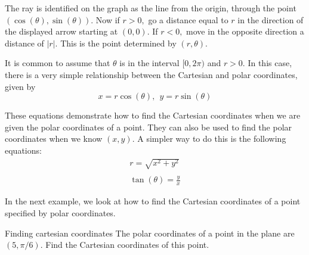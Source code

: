 The ray is identified on the graph as the line from the origin, through the point $(\cos(\theta),\sin(\theta))$. Now if $r>0,$ go a distance
equal to $r$ in the direction of the displayed arrow starting at $(0,0)$. If 
$r<0,$ move in the opposite direction a distance of $\left\vert r\right\vert 
$. This is the point determined by $\left( r,\theta \right)$.

It is common to assume that $\theta $ is in the interval $
[0,2\pi )$ and $r>0.$ In this case, there is a very simple relationship
between the Cartesian and polar coordinates, given by
\begin{equation}
x=r\cos \left( \theta \right) ,\ \ y=r\sin \left( \theta \right) 
\label{cartpolcoord}
\end{equation}

These equations demonstrate how to find the Cartesian coordinates when we are given the polar coordinates of a point. They can also be used to find the polar coordinates when we know $\left( x, y \right)$. A simpler way to do this is the following equations:
\begin{equation}
\begin{array}{l}
r = \sqrt{x^2 + y^2} \\
\\
\tan \left(\theta\right) = \frac{y}{x}
\end{array}
\label{polcartcoord}
\end{equation}

In the next example, we look at how to find the Cartesian coordinates of a point specified by polar coordinates. 

\begin{example}{Finding cartesian coordinates}{}
The polar coordinates of a point in the plane are $\left( 5,\pi /6\right) $.
Find the Cartesian coordinates of this point.
\end{example}

